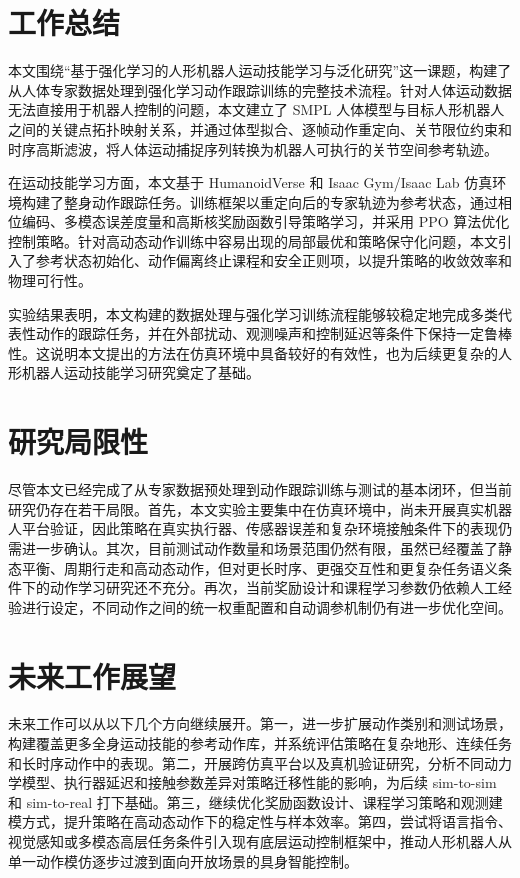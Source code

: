 \begin{conclusions}

\section{工作总结}

本文围绕“基于强化学习的人形机器人运动技能学习与泛化研究”这一课题，构建了从人体专家数据处理到强化学习动作跟踪训练的完整技术流程。针对人体运动数据无法直接用于机器人控制的问题，本文建立了 SMPL 人体模型与目标人形机器人之间的关键点拓扑映射关系，并通过体型拟合、逐帧动作重定向、关节限位约束和时序高斯滤波，将人体运动捕捉序列转换为机器人可执行的关节空间参考轨迹。

在运动技能学习方面，本文基于 HumanoidVerse 和 Isaac Gym/Isaac Lab 仿真环境构建了整身动作跟踪任务。训练框架以重定向后的专家轨迹为参考状态，通过相位编码、多模态误差度量和高斯核奖励函数引导策略学习，并采用 PPO 算法优化控制策略。针对高动态动作训练中容易出现的局部最优和策略保守化问题，本文引入了参考状态初始化、动作偏离终止课程和安全正则项，以提升策略的收敛效率和物理可行性。

实验结果表明，本文构建的数据处理与强化学习训练流程能够较稳定地完成多类代表性动作的跟踪任务，并在外部扰动、观测噪声和控制延迟等条件下保持一定鲁棒性。这说明本文提出的方法在仿真环境中具备较好的有效性，也为后续更复杂的人形机器人运动技能学习研究奠定了基础。

\section{研究局限性}

尽管本文已经完成了从专家数据预处理到动作跟踪训练与测试的基本闭环，但当前研究仍存在若干局限。首先，本文实验主要集中在仿真环境中，尚未开展真实机器人平台验证，因此策略在真实执行器、传感器误差和复杂环境接触条件下的表现仍需进一步确认。其次，目前测试动作数量和场景范围仍然有限，虽然已经覆盖了静态平衡、周期行走和高动态动作，但对更长时序、更强交互性和更复杂任务语义条件下的动作学习研究还不充分。再次，当前奖励设计和课程学习参数仍依赖人工经验进行设定，不同动作之间的统一权重配置和自动调参机制仍有进一步优化空间。

\section{未来工作展望}

未来工作可以从以下几个方向继续展开。第一，进一步扩展动作类别和测试场景，构建覆盖更多全身运动技能的参考动作库，并系统评估策略在复杂地形、连续任务和长时序动作中的表现。第二，开展跨仿真平台以及真机验证研究，分析不同动力学模型、执行器延迟和接触参数差异对策略迁移性能的影响，为后续 sim-to-sim 和 sim-to-real 打下基础。第三，继续优化奖励函数设计、课程学习策略和观测建模方式，提升策略在高动态动作下的稳定性与样本效率。第四，尝试将语言指令、视觉感知或多模态高层任务条件引入现有底层运动控制框架中，推动人形机器人从单一动作模仿逐步过渡到面向开放场景的具身智能控制。

\end{conclusions}
